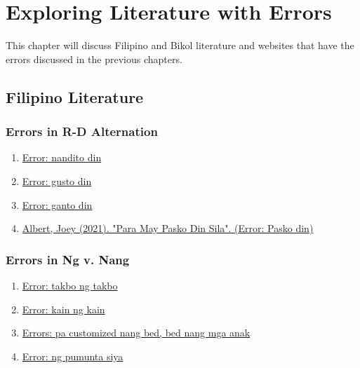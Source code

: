 \chapter{Exploring Literature with Errors}

This chapter will discuss Filipino and Bikol literature and websites that have the errors discussed in the previous chapters.

\section{Filipino Literature}
\subsection{Errors in R-D Alternation}
\begin{enumerate}
    \item \href{https://www.smartparenting.com.ph/parenting/baby/paano-malalaman-kung-hiyang-si-baby-sa-gatas-a1810-20210330}{Error: nandito din}
    \item \href{https://www.facebook.com/share/v/16AdpiPqVi/}{Error: gusto din}
    \item \href{https://www.reddit.com/r/dogsofrph/comments/1j2ywgu/ganto_din_ba_aso_nyo_mahilig_sa_yelo/}{Error: ganto din}
    \item \href{https://www.youtube.com/watch?v=LhA64RzycBk}{Albert, Joey (2021). "Para May Pasko Din Sila". (Error: Pasko din)} 
    
\end{enumerate}

\subsection{Errors in Ng v. Nang}

\begin{enumerate}
    \item \href{https://brainly.ph/question/21370957}{Error: takbo ng takbo}
    \item \href{https://www.facebook.com/teamagustintvvlogs/videos/kain-ng-kain-pero-bakit-hindi-tumataba-ano-daw-ang-aking-ginagawa/502889525820314/}{Error: kain ng kain}
    \item \href{https://www.facebook.com/groups/280224753328936/posts/1212892863395449/}{Errors: pa customized nang bed, bed nang mga anak}
    \item \href{https://harrypotter.fandom.com/f/p/3008625405222454882}{Error: ng pumunta siya}
\end{enumerate}

